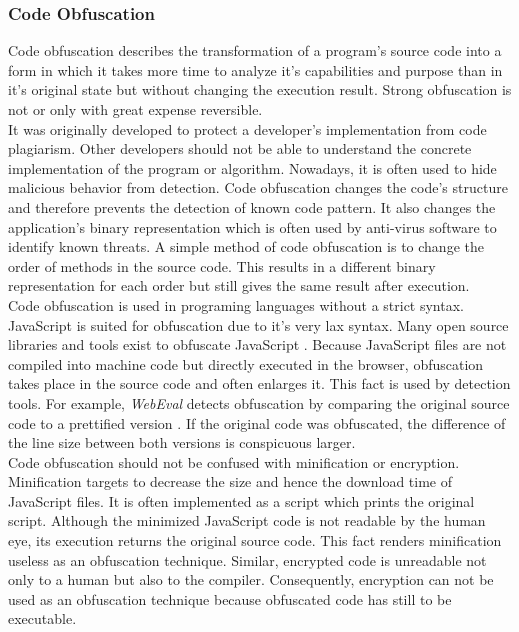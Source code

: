	
	
\subsubsection{Code Obfuscation}
		
	Code obfuscation describes the transformation of a program's source code into a form in which it takes more time to analyze it's capabilities and purpose than in it's original state but without changing the execution result. Strong obfuscation is not or only with great expense reversible. \\
	
	It was originally developed to protect a developer's implementation from code plagiarism. Other developers should not be able to understand the concrete implementation of the program or algorithm. Nowadays, it is often used to hide malicious behavior from detection. Code obfuscation changes the code's structure and therefore prevents the detection of known code pattern. It also changes the application's binary representation which is often used by anti-virus software to identify known threats. A simple method of code obfuscation is to change the order of methods in the source code. This results in a different binary representation for each order but still gives the same result after execution. \\
	
	Code obfuscation is used in programing languages without a strict syntax. JavaScript is suited for obfuscation due to it's very lax syntax. %
	Many open source libraries and tools exist to obfuscate JavaScript \cite{obfuscationDansTools, obfuscationJavascriptObfuscator, obfuscationJscrambler}. Because JavaScript files are not compiled into machine code but directly executed in the browser, obfuscation takes place in the source code and often enlarges it. This fact is used by detection tools. For example, \textit{WebEval} detects obfuscation by comparing the original source code to a prettified version \cite{190984}. If the original code was obfuscated, the difference of the line size between both versions is conspicuous larger. \\
	
	Code obfuscation should not be confused with minification or encryption. Minification targets to decrease the size and hence the download time of JavaScript files. It is often implemented as a script which prints the original script. Although the minimized JavaScript code is not readable by the human eye, its execution returns the original source code. This fact renders minification useless as an obfuscation technique. Similar, encrypted code is unreadable not only to a human but also to the compiler. Consequently, encryption can not be used as an obfuscation technique because obfuscated code has still to be executable. \\
	
